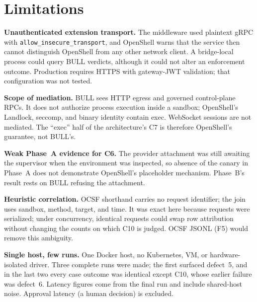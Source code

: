 \documentclass[journal]{IEEEtran}
\newcommand{\bull}{\textsc{BULL}}
\newcommand{\openshell}{OpenShell}
\begin{document}
\section{Limitations}
\label{sec:limits}
\textbf{Unauthenticated extension transport.} The middleware used plaintext gRPC with \texttt{allow\_insecure\_transport}, and \openshell{} warns that the service then cannot distinguish \openshell{} from any other network client. A bridge-local process could query \bull{} verdicts, although it could not alter an enforcement outcome. Production requires HTTPS with gateway-JWT validation; that configuration was not tested.

\textbf{Scope of mediation.} \bull{} sees HTTP egress and governed control-plane RPCs. It does not authorize process execution inside a sandbox; \openshell{}'s Landlock, seccomp, and binary identity contain exec. WebSocket sessions are not mediated. The ``exec'' half of the architecture's C7 is therefore \openshell{}'s guarantee, not \bull{}'s.

\textbf{Weak Phase~A evidence for C6.} The provider attachment was still awaiting the supervisor when the environment was inspected, so absence of the canary in Phase~A does not demonstrate \openshell{}'s placeholder mechanism. Phase~B's result rests on \bull{} refusing the attachment.

\textbf{Heuristic correlation.} OCSF shorthand carries no request identifier; the join uses sandbox, method, target, and time. It was exact here because requests were serialized; under concurrency, identical requests could swap row attribution without changing the counts on which C10 is judged. OCSF JSONL (F5) would remove this ambiguity.

\textbf{Single host, few runs.} One Docker host, no Kubernetes, VM, or hardware-isolated driver. Three complete runs were made; the first surfaced defect~5, and in the last two every case outcome was identical except C10, whose earlier failure was defect~6. Latency figures come from the final run and include shared-host noise. Approval latency (a human decision) is excluded.

\end{document}
